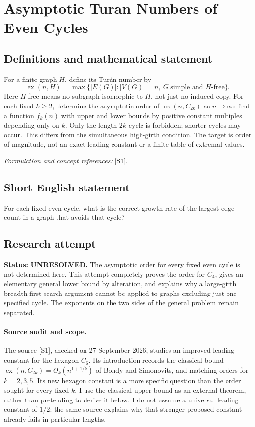 \documentclass[11pt]{article}
\begin{document}
\section*{\texorpdfstring{Asymptotic Turan Numbers of Even Cycles}{Asymptotic Turan Numbers of Even Cycles}}\label{statement}
\subsection{Definitions and mathematical statement}
For a finite graph $H$, define its Tur\'an number by
\[
 \operatorname{ex}(n,H)=\max\{|E(G)|:|V(G)|=n,\ G\text{ simple and }H\text{-free}\}.
\]
Here $H$-free means no subgraph isomorphic to $H$, not just no induced copy. For each fixed $k\ge2$, determine the asymptotic order of $\operatorname{ex}(n,C_{2k})$ as $n\to\infty$: find a function $f_k(n)$ with upper and lower bounds by positive constant multiples depending only on $k$. Only the length-$2k$ cycle is forbidden; shorter cycles may occur. This differs from the simultaneous high-girth condition. The target is order of magnitude, not an exact leading constant or a finite table of extremal values.
\par\smallskip\textit{Formulation and concept references:} \href{https://arxiv.org/html/2609.10003}{[S1]}.

\subsection{Short English statement}
For each fixed even cycle, what is the correct growth rate of the largest edge count in a graph that avoids that cycle?
\subsection{Research attempt}
\textbf{Status: UNRESOLVED.} The asymptotic order for every fixed even cycle is not determined here. This attempt completely proves the order for $C_4$, gives an elementary general lower bound by alteration, and explains why a large-girth breadth-first-search argument cannot be applied to graphs excluding just one specified cycle. The exponents on the two sides of the general problem remain separated.

\paragraph{Source audit and scope.}
The source [S1], checked on 27 September 2026, studies an improved leading constant for the hexagon $C_6$. Its introduction records the classical bound $\operatorname{ex}(n,C_{2k})=O_k(n^{1+1/k})$ of Bondy and Simonovits, and matching orders for $k=2,3,5$. Its new hexagon constant is a more specific question than the order sought for every fixed $k$. I use the classical upper bound as an external theorem, rather than pretending to derive it below. I do not assume a universal leading constant of $1/2$: the same source explains why that stronger proposed constant already fails in particular lengths.
\end{document}
